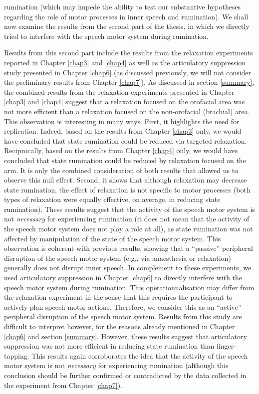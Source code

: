 \documentclass[a4paper,12pt,twoside,onecolumn,openright,final,oldfontcommands]{memoir}
\begin{document}
rumination (which may impede the ability to test our substantive hypotheses regarding the role of motor processes in inner speech and rumination). We shall now examine the results from the second part of the thesis, in which we directly tried to interfere with the speech motor system during rumination.

Results from this second part include the results from the relaxation experiments reported in Chapter \ref{chap3} and \ref{chap4} as well as the articulatory suppression study presented in Chapter \ref{chap6} (as discussed previously, we will not consider the preliminary results from Chapter \ref{chap7}). As discussed in section \ref{summary}, the combined results from the relaxation experiments presented in Chapter \ref{chap3} and \ref{chap4} suggest that a relaxation focused on the orofacial area was not more efficient than a relaxation focused on the non-orofacial (brachial) area. This observation is interesting in many ways. First, it highlights the need for replication. Indeed, based on the results from Chapter \ref{chap3} only, we would have concluded that state rumination could be reduced via targeted relaxation. Reciprocally, based on the results from Chapter \ref{chap4} only, we would have concluded that state rumination could be reduced by relaxation focused on the arm. It is only the combined consideration of both results that allowed us to observe this null effect. Second, it shows that although relaxation may decrease state rumination, the effect of relaxation is not specific to motor processes (both types of relaxation were equally effective, on average, in reducing state rumination). These results suggest that the activity of the speech motor system is not \emph{necessary} for experiencing rumination (it does not mean that the activity of the speech motor system does not play a role at all), as state rumination was not affected by manipulation of the state of the speech motor system. This observation is coherent with previous results, showing that a \enquote{passive} peripheral disruption of the speech motor system (e.g., via anaesthesia or relaxation) generally does not disrupt inner speech. In complement to these experiments, we used articulatory suppression in Chapter \ref{chap6} to directly interfere with the speech motor system during rumination. This operationnalisation may differ from the relaxation experiment in the sense that this requires the participant to actively plan speech motor actions. Therefore, we consider this as an \enquote{active} peripheral disruption of the speech motor system. Results from this study are difficult to interpret however, for the reasons already mentioned in Chapter \ref{chap6} and section \ref{summary}. However, these results suggest that articulatory suppression was not more efficient in reducing state rumination than finger-tapping. This results again corroborates the idea that the activity of the speech motor system is not \emph{necessary} for experiencing rumination (although this conclusion should be further confirmed or contradicted by the data collected in the experiment from Chapter \ref{chap7}).
\end{document}
